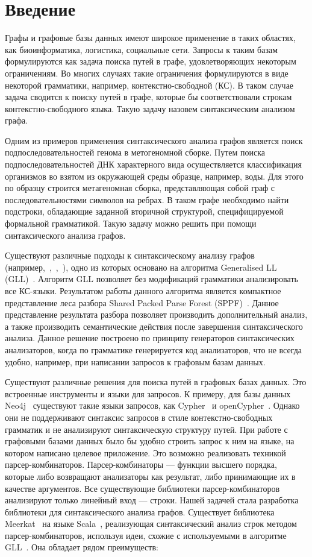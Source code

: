 \section*{Введение}
Графы и графовые базы данных имеют широкое применение в таких областях, как биоинформатика, логистика, социальные сети. Запросы к таким базам формулируются как задача поиска путей в графе, удовлетворяющих некоторым ограничениям. Во многих случаях такие ограничения формулируются в виде некоторой грамматики, например, контекстно-свободной (КС). В таком случае задача сводится к поиску путей в графе, которые бы соответствовали строкам контекстно-свободного языка. Такую задачу назовем синтаксическим анализом графа. 

Одним из примеров применения синтаксического анализа графов является поиск подпоследовательностей генома в метогеномной сборке. Путем поиска подпоследовательностей ДНК характерного вида осуществляется классификация организмов во взятом из окружающей среды образце, например, воды. Для этого по образцу строится метагеномная сборка, представляющая собой граф с последовательностями символов на ребрах. В таком графе необходимо найти подстроки, обладающие заданной вторичной структурой, специфицируемой формальной грамматикой. Такую задачу можно решить при помощи синтаксического анализа графов.

Существуют различные подходы к синтаксическому анализу графов (например,~\cite{GrigRagCFPQuerying},~\cite{Hellings},~\cite{Sevon}), одно из которых основано на алгоритма Generalised LL (GLL)~\cite{GrigRagCFPQuerying}. Алгоритм GLL позволяет без модификаций грамматики анализировать все КС-языки. Результатом работы данного алгоритма является компактное представление леса разбора Shared Packed Parse Forest (SPPF)~\cite{SPPF}. Данное представление результата разбора позволяет производить дополнительный анализ, а также производить семантические действия после завершения синтаксического анализа. Данное решение построено по принципу генераторов синтаксических анализаторов, когда по грамматике генерируется код анализаторов, что не всегда удобно, например, при написании запросов к графовым базам данных.

Существуют различные решения для поиска путей в графовых базах данных. Это встроенные инструменты и языки для запросов. К примеру, для базы данных Neo4j~\cite{Neo4j} существуют такие языки запросов, как Cypher~\cite{Cypher} и openCypher~\cite{openCypher}. Однако они не поддерживают синтаксис запросов в стиле контекстно-свободных грамматик и не анализируют синтаксическую структуру путей. При работе с графовыми базами данных было бы удобно строить запрос к ним на языке, на котором написано целевое приложение. Это возможно реализовать техникой парсер-комбинаторов. Парсер-комбинаторы --- функции высшего порядка, которые либо возвращают анализаторы как результат, либо принимающие их в качестве аргументов. Все существующие библиотеки парсер-комбинаторов анализируют только линейный вход --- строки. Нашей задачей стала разработка библиотеки для синтаксического анализа графов. Существует библиотека Meerkat~\cite{Meerkat} на языке Scala~\cite{Scala}, реализующая синтаксический анализ строк методом парсер-комбинаторов, используя идеи, схожие с используемыми в алгоритме GLL~\cite{GLL}. Она обладает рядом преимуществ:

